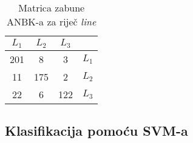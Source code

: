 \documentclass[10pt, a4paper]{article}
\begin{document}
\begin{table}[!hbtp]
\caption{Matrica zabune ANBK-a za riječ \emph{line}}
\label{tab:line_confusion_bayes}
\begin{center}
\begin{tabular}{|ccc|c|}
\hline
$L_1$ & $L_2$ & $L_3$ &  \\
\hline
  201 &  8  &  3  &   $L_1$ \\
  11  & 175 &  2  &   $L_2$ \\
  22  & 6   & 122 &   $L_3$ \\
\hline
\end{tabular}
\end{center}
\end{table}

\subsection{Klasifikacija pomoću SVM-a}
\end{document}
